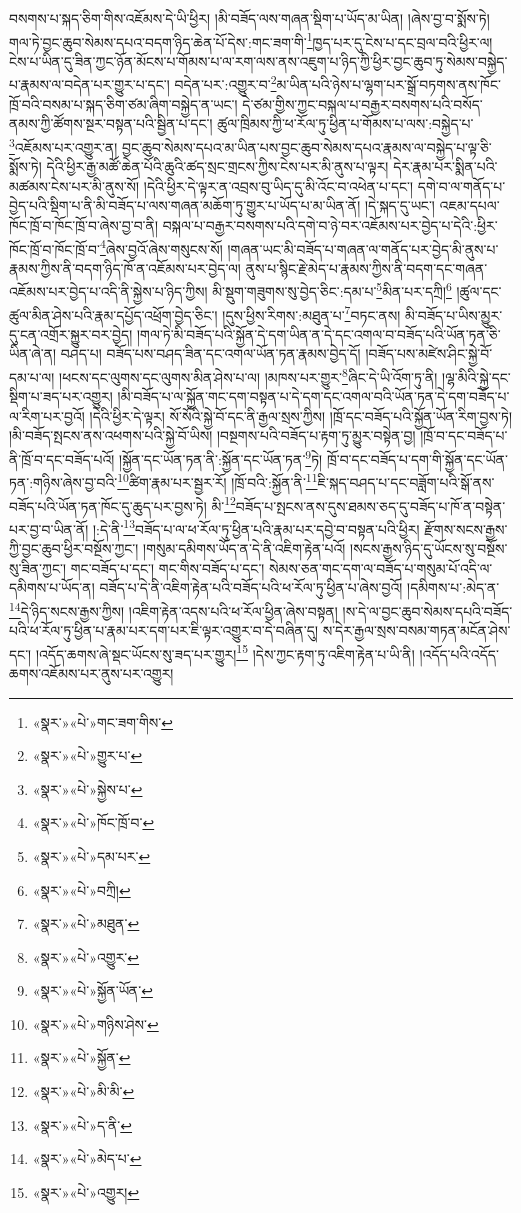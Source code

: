 བསགས་པ་སྐད་ཅིག་གིས་འཇོམས་དེ་ཡི་ཕྱིར། །མི་བཟོད་ལས་གཞན་སྡིག་པ་ཡོད་མ་ཡིན། །ཞེས་བྱ་བ་སྨོས་ཏེ། གལ་ཏེ་བྱང་ཆུབ་སེམས་དཔའ་བདག་ཉིད་ཆེན་པོ་དེས་:གང་ཟག་གི་\footnote{«སྣར་»«པེ་»གང་ཟག་གིས་}ཁྱད་པར་དུ་ངེས་པ་དང་བྲལ་བའི་ཕྱིར་ལ། ངེས་པ་ཡིན་དུ་ཟིན་ཀྱང་ཉོན་མོངས་པ་གོམས་པ་ལ་རག་ལས་ནས་འཇུག་པ་ཉིད་ཀྱི་ཕྱིར་བྱང་ཆུབ་ཏུ་སེམས་བསྐྱེད་པ་རྣམས་ལ་བདེན་པར་གྱུར་པ་དང་། བདེན་པར་:འགྱུར་བ་\footnote{«སྣར་»«པེ་»གྱུར་པ་}མ་ཡིན་པའི་ཉེས་པ་ལྷག་པར་སྒྲོ་བཏགས་ནས་ཁོང་ཁྲོ་བའི་བསམ་པ་སྐད་ཅིག་ཙམ་ཞིག་བསྐྱེད་ན་ཡང་། དེ་ཙམ་གྱིས་ཀྱང་བསྐལ་པ་བརྒྱར་བསགས་པའི་བསོད་ནམས་ཀྱི་ཚོགས་སྔར་བསྟན་པའི་སྦྱིན་པ་དང་། ཚུལ་ཁྲིམས་ཀྱི་ཕ་རོལ་ཏུ་ཕྱིན་པ་གོམས་པ་ལས་:བསྐྱེད་པ་\footnote{«སྣར་»«པེ་»སྐྱེས་པ་}འཇོམས་པར་འགྱུར་ན། བྱང་ཆུབ་སེམས་དཔའ་མ་ཡིན་པས་བྱང་ཆུབ་སེམས་དཔའ་རྣམས་ལ་བསྐྱེད་པ་ལྟ་ཅི་སྨོས་ཏེ། དེའི་ཕྱིར་རྒྱ་མཚོ་ཆེན་པོའི་ཆུའི་ཚད་སྲང་གྲངས་ཀྱིས་ངེས་པར་མི་ནུས་པ་ལྟར། དེར་རྣམ་པར་སྨིན་པའི་མཚམས་ངེས་པར་མི་ནུས་སོ། །དེའི་ཕྱིར་དེ་ལྟར་ན་འབྲས་བུ་ཡིད་དུ་མི་འོང་བ་འཕེན་པ་དང་། དགེ་བ་ལ་གནོད་པ་བྱེད་པའི་སྡིག་པ་ནི་མི་བཟོད་པ་ལས་གཞན་མཆོག་ཏུ་གྱུར་པ་ཡོད་པ་མ་ཡིན་ནོ། །དེ་སྐད་དུ་ཡང་། འཇམ་དཔལ་ཁོང་ཁྲོ་བ་ཁོང་ཁྲོ་བ་ཞེས་བྱ་བ་ནི། བསྐལ་པ་བརྒྱར་བསགས་པའི་དགེ་བ་ཉེ་བར་འཇོམས་པར་བྱེད་པ་དེའི་:ཕྱིར་ཁོང་ཁྲོ་བ་ཁོང་ཁྲོ་བ་\footnote{«སྣར་»«པེ་»ཁོང་ཁྲོ་བ་}ཞེས་བྱའོ་ཞེས་གསུངས་སོ། །གཞན་ཡང་མི་བཟོད་པ་གཞན་ལ་གནོད་པར་བྱེད་མི་ནུས་པ་རྣམས་ཀྱིས་ནི་བདག་ཉིད་ཁོ་ན་འཇོམས་པར་བྱེད་ལ། ནུས་པ་སྙིང་རྗེ་མེད་པ་རྣམས་ཀྱིས་ནི་བདག་དང་གཞན་འཇོམས་པར་བྱེད་པ་འདི་ནི་སྐྱེས་པ་ཉིད་ཀྱིས། མི་སྡུག་གཟུགས་སུ་བྱེད་ཅིང་:དམ་པ་\footnote{«སྣར་»«པེ་»དམ་པར་}མིན་པར་དཀྲི།\footnote{«སྣར་»«པེ་»བཀྲི།} །ཚུལ་དང་ཚུལ་མིན་ཤེས་པའི་རྣམ་དཔྱོད་འཕྲོག་བྱེད་ཅིང་། །དུས་ཕྱིས་རིགས་:མཐུན་པ་\footnote{«སྣར་»«པེ་»མཐུན་}བཏང་ནས། མི་བཟོད་པ་ཡིས་མྱུར་དུ་ངན་འགྲོར་སྐྱུར་བར་བྱེད། །གལ་ཏེ་མི་བཟོད་པའི་སྐྱོན་དེ་དག་ཡིན་ན་དེ་དང་འགལ་བ་བཟོད་པའི་ཡོན་ཏན་ཅི་ཡིན་ཞེ་ན། བཤད་པ། བཟོད་པས་བཤད་ཟིན་དང་འགལ་ཡོན་ཏན་རྣམས་བྱེད་དོ། །བཟོད་པས་མཛེས་ཤིང་སྐྱེ་བོ་དམ་པ་ལ། །ཕངས་དང་ལུགས་དང་ལུགས་མིན་ཤེས་པ་ལ། །མཁས་པར་གྱུར་\footnote{«སྣར་»«པེ་»འགྱུར་}ཞིང་དེ་ཡི་འོག་ཏུ་ནི། །ལྷ་མིའི་སྐྱེ་དང་སྡིག་པ་ཟད་པར་འགྱུར། །མི་བཟོད་པ་ལ་སྐྱོན་གང་དག་བསྟན་པ་དེ་དག་དང་འགལ་བའི་ཡོན་ཏན་དེ་དག་བཟོད་པ་ལ་རིག་པར་བྱའོ། །དེའི་ཕྱིར་དེ་ལྟར། སོ་སོའི་སྐྱེ་བོ་དང་ནི་རྒྱལ་སྲས་ཀྱིས། །ཁྲོ་དང་བཟོད་པའི་སྐྱོན་ཡོན་རིག་བྱས་ཏེ། །མི་བཟོད་སྤངས་ནས་འཕགས་པའི་སྐྱེ་བོ་ཡིས། །བསྔགས་པའི་བཟོད་པ་རྟག་ཏུ་མྱུར་བསྟེན་བྱ། །ཁྲོ་བ་དང་བཟོད་པ་ནི་ཁྲོ་བ་དང་བཟོད་པའོ། །སྐྱོན་དང་ཡོན་ཏན་ནི་:སྐྱོན་དང་ཡོན་ཏན་\footnote{«སྣར་»«པེ་»སྐྱོན་ཡོན་}ཏེ། ཁྲོ་བ་དང་བཟོད་པ་དག་གི་སྐྱོན་དང་ཡོན་ཏན་:གཉིས་ཞེས་བྱ་བའི་\footnote{«སྣར་»«པེ་»གཉིས་ཤེས་}ཚིག་རྣམ་པར་སྦྱར་རོ། །ཁྲོ་བའི་:སྐྱོན་ནི་\footnote{«སྣར་»«པེ་»སྐྱོན་}ཇི་སྐད་བཤད་པ་དང་བཟློག་པའི་སྒོ་ནས་བཟོད་པའི་ཡོན་ཏན་ཁོང་དུ་ཆུད་པར་བྱས་ཏེ། མི་\footnote{«སྣར་»«པེ་»མི་མི་}བཟོད་པ་སྤངས་ནས་དུས་ཐམས་ཅད་དུ་བཟོད་པ་ཁོ་ན་བསྟེན་པར་བྱ་བ་ཡིན་ནོ། །:དེ་ནི་\footnote{«སྣར་»«པེ་»ད་ནི་}བཟོད་པ་ལ་ཕ་རོལ་ཏུ་ཕྱིན་པའི་རྣམ་པར་དབྱེ་བ་བསྟན་པའི་ཕྱིར། རྫོགས་སངས་རྒྱས་ཀྱི་བྱང་ཆུབ་ཕྱིར་བསྔོས་ཀྱང་། །གསུམ་དམིགས་ཡོད་ན་དེ་ནི་འཇིག་རྟེན་པའོ། །སངས་རྒྱས་ཉིད་དུ་ཡོངས་སུ་བསྔོས་སུ་ཟིན་ཀྱང་། གང་བཟོད་པ་དང་། གང་གིས་བཟོད་པ་དང་། སེམས་ཅན་གང་དག་ལ་བཟོད་པ་གསུམ་པོ་འདི་ལ་དམིགས་པ་ཡོད་ན། བཟོད་པ་དེ་ནི་འཇིག་རྟེན་པའི་བཟོད་པའི་ཕ་རོལ་ཏུ་ཕྱིན་པ་ཞེས་བྱའོ། །དམིགས་པ་:མེད་ན་\footnote{«སྣར་»«པེ་»མེད་པ་}དེ་ཉིད་སངས་རྒྱས་ཀྱིས། །འཇིག་རྟེན་འདས་པའི་ཕ་རོལ་ཕྱིན་ཞེས་བསྟན། །ས་དེ་ལ་བྱང་ཆུབ་སེམས་དཔའི་བཟོད་པའི་ཕ་རོལ་ཏུ་ཕྱིན་པ་རྣམ་པར་དག་པར་ཇི་ལྟར་འགྱུར་བ་དེ་བཞིན་དུ། ས་དེར་རྒྱལ་སྲས་བསམ་གཏན་མངོན་ཤེས་དང་། །འདོད་ཆགས་ཞེ་སྡང་ཡོངས་སུ་ཟད་པར་གྱུར།\footnote{«སྣར་»«པེ་»འགྱུར།} །དེས་ཀྱང་རྟག་ཏུ་འཇིག་རྟེན་པ་ཡི་ནི། །འདོད་པའི་འདོད་ཆགས་འཇོམས་པར་ནུས་པར་འགྱུར། 